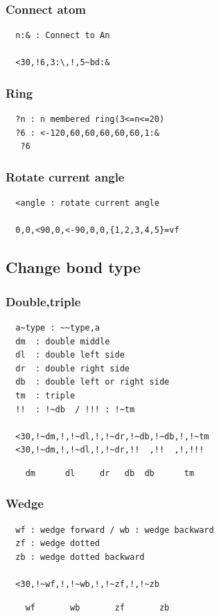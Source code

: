 \documentclass[a4paper]{article}
\makeatletter
\def\MCFstructure{\hspace{5mm}{\@strufont\char\fontnum}\advance\fontnum\@ne\relax}%
\makeatother
\begin{document}
\subsubsection{Connect atom}
\begin{verbatim}
  n:& : Connect to An

  <30,!6,3:\,!,5~bd:&
\end{verbatim}
\MCFstructure
\subsubsection{Ring}
\begin{verbatim}
  ?n : n membered ring(3<=n<=20)
  ?6 : <-120,60,60,60,60,60,1:&
   ?6
\end{verbatim}
\MCFstructure
\subsubsection{Rotate current angle}
\begin{verbatim}
  <angle : rotate current angle

  0,0,<90,0,<-90,0,0,{1,2,3,4,5}=vf 
\end{verbatim}
\MCFstructure
\subsection{Change bond type}
\subsubsection{Double,triple}
\begin{verbatim}
  a~type : ~~type,a
  dm  : double middle
  dl  : double left side
  dr  : double right side
  db  : double left or right side
  tm  : triple
  !!  : !~db  / !!! : !~tm

  <30,!~dm,!,!~dl,!,!~dr,!~db,!~db,!,!~tm
  <30,!~dm,!,!~dl,!,!~dr,!!  ,!!  ,!,!!!
\end{verbatim}
\MCFstructure
\vspace{-3mm}%
\begin{verbatim}
    dm      dl     dr   db  db      tm
\end{verbatim}
\subsubsection{Wedge}
\begin{verbatim}
  wf : wedge forward / wb : wedge backward
  zf : wedge dotted
  zb : wedge dotted backward

  <30,!~wf,!,!~wb,!,!~zf,!,!~zb
\end{verbatim}
\MCFstructure
\vspace{-3mm}%
\begin{verbatim}
    wf       wb       zf       zb
\end{verbatim}
\end{document}
